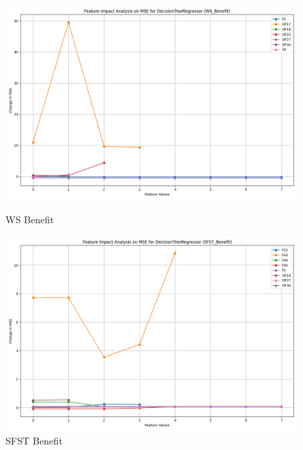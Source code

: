 \begin{figure}[H]
    \centering
    \begin{minipage}{0.495\textwidth}
        \centering
        \includegraphics[width=\linewidth]{analysis/images_reg/feature_impact_mse_WS_Benefit_DecisionTreeRegressor.png}
        \caption{WS Benefit}
        \label{fig:ws_ben_mse_analysis}
    \end{minipage}\hfill
    \begin{minipage}{0.495\textwidth}
        \centering
        \includegraphics[width=\linewidth]{analysis/images_reg/feature_impact_mse_SFST_Benefit_DecisionTreeRegressor.png}
        \caption{SFST Benefit}
        \label{fig:sfst_ben_mse_analysis}
    \end{minipage}
\end{figure}


